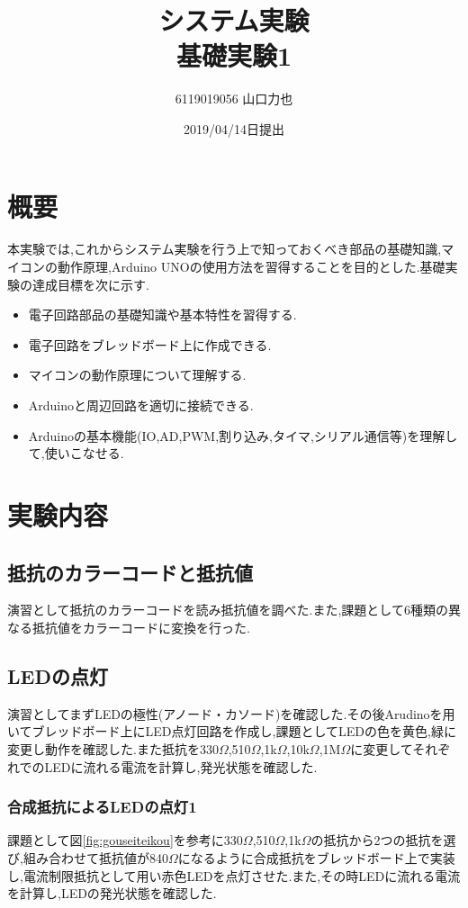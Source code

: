 \documentclass{jarticle}
\title{{システム実験}\\基礎実験1}
\author{6119019056 山口力也}
\date{2019/04/14日提出}
\begin{document}
\maketitle

\section{概要}
本実験では,これからシステム実験を行う上で知っておくべき部品の基礎知識,マイコンの動作原理,Arduino UNOの使用方法を習得することを目的とした.基礎実験の達成目標を次に示す.

\begin{itemize}

\item 電子回路部品の基礎知識や基本特性を習得する.
\item 電子回路をブレッドボード上に作成できる.
\item マイコンの動作原理について理解する.
\item Arduinoと周辺回路を適切に接続できる.
\item Arduinoの基本機能(IO,AD,PWM,割り込み,タイマ,シリアル通信等)を理解して,使いこなせる.

\end{itemize}

\section{実験内容}
\subsection{抵抗のカラーコードと抵抗値}
\label{subsec:colorcode}
演習として抵抗のカラーコードを読み抵抗値を調べた.また,課題として6種類の異なる抵抗値をカラーコードに変換を行った.
\subsection{LEDの点灯}
\label{subsec:led}
演習としてまずLEDの極性(アノード・カソード)を確認した.その後Arudinoを用いてブレッドボード上にLED点灯回路を作成し,課題としてLEDの色を黄色,緑に変更し動作を確認した.また抵抗を330$\Omega$,510$\Omega$,1k$\Omega$,10k$\Omega$,1M$\Omega$に変更してそれぞれでのLEDに流れる電流を計算し,発光状態を確認した.

\subsubsection{合成抵抗によるLEDの点灯1}
\label{subsubsec:gouseiled1}
課題として図\ref{fig:gouseiteikou}を参考に330$\Omega$,510$\Omega$,1k$\Omega$の抵抗から2つの抵抗を選び,組み合わせて抵抗値が840$\Omega$になるように合成抵抗をブレッドボード上で実装し,電流制限抵抗として用い赤色LEDを点灯させた.また,その時LEDに流れる電流を計算し,LEDの発光状態を確認した.
\end{document}
